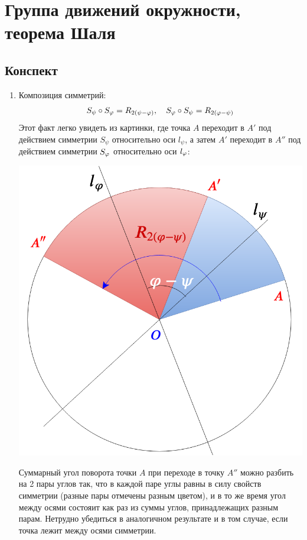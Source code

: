 \section{Группа движений окружности, теорема Шаля}

\subsection*{Конспект}
\begin{enumerate}\setlength{\itemsep}{1pt}
\item Композиция симметрий: 
$$
S_\psi\circ S_\varphi=R_{2(\psi-\varphi)},\quad S_\varphi\circ S_\psi=R_{2(\varphi-\psi)}
$$
Этот факт легко увидеть из картинки, где точка $A$ переходит в $A'$ под действием симметрии $S_\psi$ относительно оси $l_\psi$, а затем $A'$ переходит в $A''$ под действием симметрии $S_\varphi$ относительно оси $l_\varphi$:

\begin{center}
\includegraphics[scale=0.25]{Rund.png}
\end{center}

Суммарный угол поворота точки $A$ при переходе в точку $A''$ можно разбить на 2 пары углов так, что в каждой паре углы равны в силу свойств симметрии (разные пары отмечены разным цветом), и в то же время угол между осями состояит как раз из суммы углов, принадлежащих разным парам. Нетрудно убедиться в аналогичном результате и в том случае, если точка лежит между осями симметрии.


\end{enumerate}
